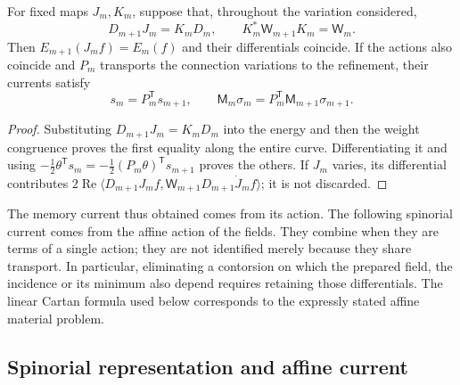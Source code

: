 \begin{proposition}
\label{hmtcuatro:ant:refinamiento-corriente} For fixed maps \(J_m,K_m\), suppose that, throughout the variation considered,
\[
 D_{m+1}J_m=K_mD_m,\qquad
 K_m^*\mathsf W_{m+1}K_m=\mathsf W_m .
\]
Then \(E_{m+1}(J_mf)=E_m(f)\) and their differentials coincide. If the actions also coincide and \(P_m\) transports the connection variations to the refinement, their currents satisfy
\[
 s_m=P_m^{\mathsf T}s_{m+1},\qquad
 \mathsf M_m\sigma_m=P_m^{\mathsf T}\mathsf M_{m+1}\sigma_{m+1}.
\]
\end{proposition}
\begin{proof}
Substituting \(D_{m+1}J_m=K_mD_m\) into the energy and then the weight congruence proves the first equality along the entire curve. Differentiating it and using \(-\frac12\theta^{\mathsf T}s_m
=-\frac12(P_m\theta)^{\mathsf T}s_{m+1}\) proves the others. If \(J_m\) varies, its differential contributes \(2\operatorname{Re}\langle D_{m+1}J_mf,
\mathsf W_{m+1}D_{m+1}\dot J_m f\rangle\); it is not discarded.
\end{proof}

The memory current thus obtained comes from its action. The following spinorial current comes from the affine action of the fields. They combine when they are terms of a single action; they are not identified merely because they share transport. In particular, eliminating a contorsion on which the prepared field, the incidence or its minimum also depend requires retaining those differentials. The linear Cartan formula used below corresponds to the expressly stated affine material problem.

\subsection{Spinorial representation and affine current}
\label{hmtcuatro:ant:espinores}

